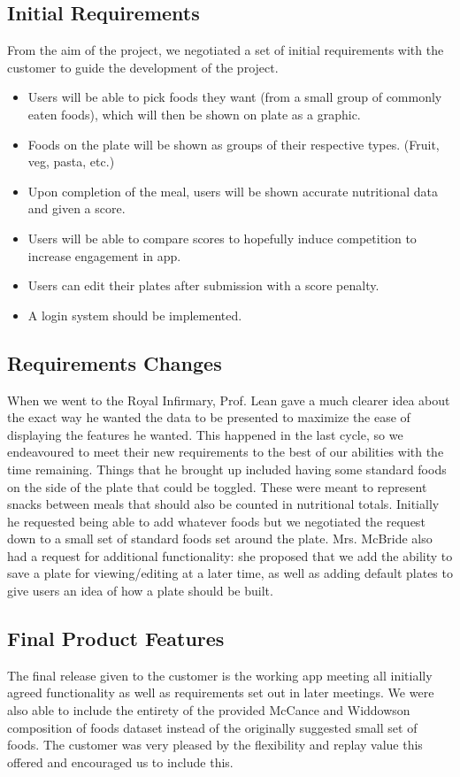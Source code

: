 \documentclass{l3proj}
\begin{document}
\subsection{Initial Requirements}
From the aim of the project, we negotiated a set of initial requirements with the customer to guide the development of the project.
\begin{itemize}
    \item Users will be able to pick foods they want (from a small group of commonly eaten foods), which will then be shown on plate as a graphic. 
    \item Foods on the plate will be shown as groups of their respective types. (Fruit, veg, pasta, etc.)
    \item Upon completion of the meal, users will be shown accurate nutritional data and given a score.
    \item Users will be able to compare scores to hopefully induce competition to increase engagement in app.
    \item Users can edit their plates after submission with a score penalty.
    \item A login system should be implemented.
\end{itemize}

\subsection{Requirements Changes}
When we went to the Royal Infirmary, Prof. Lean gave a much clearer idea about the exact way he wanted the data to be presented to maximize the ease of displaying the features he wanted. This happened in the last cycle, so we endeavoured to meet their new requirements to the best of our abilities with the time remaining. Things that he brought up included having some standard foods on the side of the plate that could be toggled. These were meant to represent snacks between meals that should also be counted in nutritional totals. Initially he requested being able to add whatever foods but we negotiated the request down to a small set of standard foods set around the plate. Mrs. McBride also had a request for additional functionality: she proposed that we add the ability to save a plate for viewing/editing at a later time, as well as adding default plates to give users an idea of how a plate should be built.

\subsection{Final Product Features}
The final release given to the customer is the working app meeting all initially agreed functionality as well as requirements set out in later meetings. We were also able to include the entirety of the provided McCance and Widdowson \cite{mccancewiddowson} composition of foods dataset instead of the originally suggested small set of foods. The customer was very pleased by the flexibility and replay value this offered and encouraged us to include this.
\end{document}
